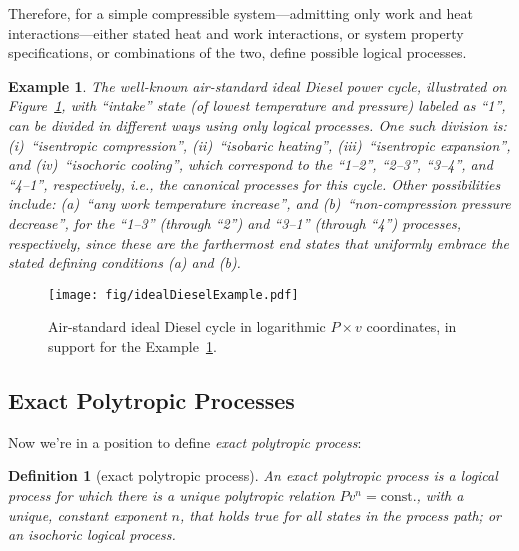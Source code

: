 \documentclass[10pt,a4paper]{article}
\newtheorem{definition}{Definition}
\newtheorem{example}{Example}
\begin{document}
\begin{multicols*}{2}
    Therefore,   for   a   simple   compressible   system---admitting   only   work   and   heat
    interactions---either stated heat and work interactions, or system property  specifications,
    or combinations of the two, define possible logical processes.

    \begin{example}\label{ex:ideal.Diesel}
        The   well-known   air-standard   ideal   Diesel    power    cycle,    illustrated    on
        Figure~\ref{fig:cycle.Diesel},  with  ``intake''  state  (of  lowest   temperature   and
        pressure) labeled as ``1'',  can  be  divided  in  different  ways  using  only  logical
        processes.  One  such  division  is:  (i)~``isentropic  compression'',   (ii)~``isobaric
        heating'',  (iii)~``isentropic  expansion'',  and  (iv)~``isochoric   cooling'',   which
        correspond to the ``1--2'', ``2--3'', ``3--4'', and ``4--1'',  respectively,  i.e.,  the
        canonical  processes  for  this  cycle.  Other  possibilities  include:  (a)~``any  work
        temperature increase'', and (b)~``non-compression pressure decrease'', for the  ``1--3''
        (through ``2'') and ``3--1'' (through ``4'') processes, respectively,  since  these  are
        the farthermost end states that uniformly embrace the stated defining conditions (a) and
        (b).
    \end{example}

    \begin{figure}[H] %
        \centering
        \label{fig:cycle.Diesel}
        \texttt{[image: fig/idealDieselExample.pdf]}
        \caption{Air-standard ideal Diesel cycle in  logarithmic  $P\times  v$  coordinates,  in
            support for the Example~\ref{ex:ideal.Diesel}.}
    \end{figure}

    \subsection{Exact Polytropic Processes}

    Now we're in a position to define \emph{exact polytropic process}:

    \begin{definition}[exact polytropic process]\label{def:exact.poly.proc}
        An exact polytropic process is a logical process for which there is a unique  polytropic
        relation $Pv^n = \mbox{const.}$, with a unique, constant exponent $n$, that  holds  true
        for all states in the process path; or an isochoric logical process.
    \end{definition}


\end{multicols*}
\end{document}
